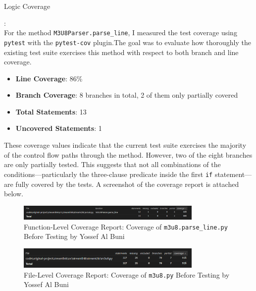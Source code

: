 \documentclass[a4paper]{scrreprt}
\newcounter{question}
\begin{document}
\begin{question}{Logic Coverage}
\begin{enumerate}[topsep=0pt, leftmargin=*]
\begin{answer}
:\\ For the method \verb|M3U8Parser.parse_line|, I measured the test coverage using \verb|pytest| with the \verb|pytest-cov| plugin.The goal was to evaluate how thoroughly the existing test suite exercises this method with respect to both branch and line coverage.
\begin{itemize}
  \item \textbf{Line Coverage}: 86\%
  \item \textbf{Branch Coverage}: 8 branches in total, 2 of them only partially covered
  \item \textbf{Total Statements}: 13
  \item \textbf{Uncovered Statements}: 1
\end{itemize}
These coverage values indicate that the current test suite exercises the majority of the control flow paths through the method. However, two of the eight branches are only partially tested. This suggests that not all combinations of the conditions---particularly the three-clause predicate inside the first \texttt{if} statement---are fully covered by the tests.
A screenshot of the coverage report is attached below.
\begin{figure}[H]
  \centering
  \includegraphics[width=0.8\textwidth]{parse_line.png}
  \caption{Function-Level Coverage Report: Coverage of \texttt{m3u8.parse\_line.py} Before Testing by Yossef Al Buni}
  \label{fig:yossefs_bild}
\end{figure}
\begin{figure}[H]
  \centering
  \includegraphics[width=0.8\textwidth]{m3u8.png}
  \caption{File-Level Coverage Report: Coverage of \texttt{m3u8.py} Before Testing by Yossef Al Buni}
  \label{fig:yossefs_bild}
\end{figure}

          \end{answer}


\end{enumerate}
\end{question}
\end{document}

